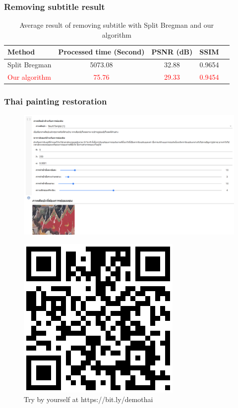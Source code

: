 \documentclass[xcolor=dvipsnames, xetex,serif]{beamer}
\begin{document}
    \begin{frame}
        \frametitle{Removing subtitle result}
        \begin{table}[H]
            \centering
            \captionsetup{justification=centering}
            \begin{tabular}[ht]{|l|c|c|c|c|}
                \hline
                Method  & Processed time  (Second) & PSNR (dB) & SSIM \\
                \hline
                Split Bregman & 5073.08 & 32.88 & 0.9654 \\
                \textcolor{red}{Our algorithm} & \textcolor{red}{75.76} & \textcolor{red}{29.33} & \textcolor{red}{0.9454} \\
                \hline
            \end{tabular}
            \caption{
                Average result of removing subtitle with Split Bregman and our algorithm }
        \end{table}	
    \end{frame}
    \begin{frame}
        \frametitle{Thai painting restoration}
        \centering
        \begin{figure}[H]
            \centering
            \includegraphics[width=0.7\linewidth]{images/colab_sample.png}
        \end{figure}
        \begin{figure}[H]
            \centering
            \includegraphics[width=0.1\linewidth]{images/colab_qr.png}
            \caption{Try by yourself at https://bit.ly/demothai}
        \end{figure}
    \end{frame}
\end{document}
